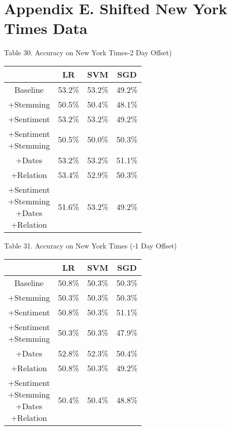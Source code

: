 \documentclass[11pt,a4paper]{article}
\begin{document}
\section{Appendix E. Shifted New York Times Data}
\begin{center}
Table 30. Accuracy on New York Times-2 Day Offset)\\
\begin{tabular}{ |c|c|c|c| }
 \hline
  & LR & SVM & SGD \\
  \hline
  Baseline & 53.2\% & 53.2\% & 49.2\% \\
  \hline
 +Stemming & 50.5\% & 50.4\% & 48.1\% \\
  \hline
 +Sentiment & 53.2\% & 53.2\% & 49.2\% \\
  \hline
  \shortstack{+Sentiment \\ +Stemming} & 50.5\% & 50.0\% & 50.3\%\\
 \hline
 +Dates & 53.2\% & 53.2\% & 51.1\% \\
  \hline
 +Relation & 53.4\% & 52.9\% & 50.3\% \\
  \hline
  \shortstack{+Sentiment \\ +Stemming \\+Dates \\+Relation} & 51.6\% & 53.2\% & 49.2\% \\
 \hline
\end{tabular}
\end{center}

\begin{center}
Table 31. Accuracy on New York Times (-1 Day Offset)\\
\begin{tabular}{ |c|c|c|c| }
 \hline
  & LR & SVM & SGD \\
  \hline
  Baseline & 50.8\% & 50.3\% & 50.3\% \\
  \hline
 +Stemming & 50.3\% & 50.3\% & 50.3\% \\
  \hline
 +Sentiment & 50.8\% & 50.3\% & 51.1\% \\
  \hline
  \shortstack{+Sentiment \\ +Stemming} & 50.3\% & 50.3\% & 47.9\%\\
 \hline
 +Dates & 52.8\% & 52.3\% & 50.4\% \\
  \hline
 +Relation & 50.8\% & 50.3\% & 49.2\% \\
  \hline
  \shortstack{+Sentiment \\ +Stemming \\+Dates \\+Relation} & 50.4\% & 50.4\% & 48.8\% \\
 \hline
\end{tabular}
\end{center}
\end{document}
